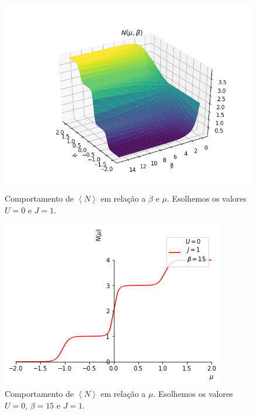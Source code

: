 \begin{figure}[!h]
\includegraphics[scale=.5]{Content/N_mu_beta.png}
\caption{Comportamento de $\left<N\right>$ em relação a $\beta$ e $\mu$. Esolhemos os valores $U=0$ e $J=1$.}
\label{N}
\end{figure}

\begin{figure}[!h]
\includegraphics[scale=.7]{Content/N_mu.png}
\caption{Comportamento de $\left<N\right>$ em relação a $\mu$. Esolhemos os valores $U=0$, $\beta=15$ e $J=1$.}
\label{beta}
\end{figure}